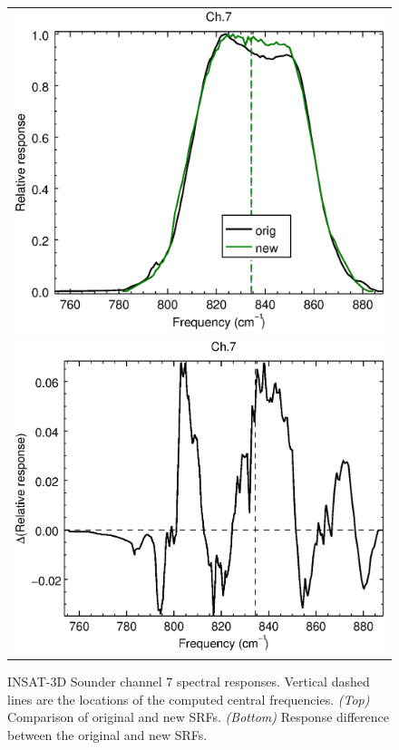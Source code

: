 \begin{figure}[H]
  \centering
  \begin{tabular}{c}
    \includegraphics[scale=0.55]{graphics/sndr/srf/sndr_insat3d-7.eps} \\
    \includegraphics[scale=0.55]{graphics/sndr/srf/sndr_insat3d-7.difference.eps}
  \end{tabular}
  \caption{INSAT-3D Sounder channel 7 spectral responses. Vertical dashed lines are the locations of the computed central frequencies. \emph{(Top)} Comparison of original and new SRFs. \emph{(Bottom)} Response difference between the original and new SRFs.}
  \label{fig:sndr_ch7}
\end{figure}


